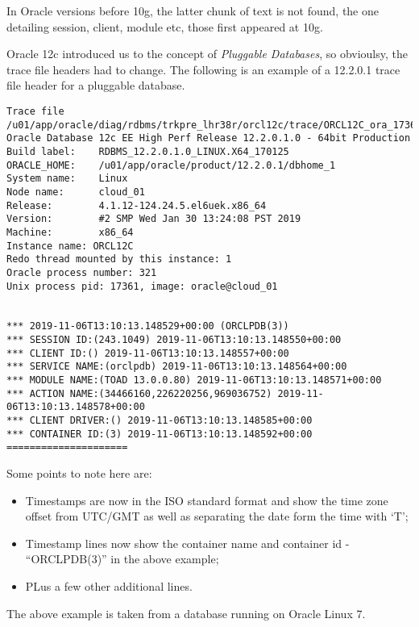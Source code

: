 In Oracle versions before 10g, the latter chunk of text is not found, the one detailing session, client, module etc, those first appeared at 10g.

Oracle 12c introduced us to the concept of \emph{Pluggable Databases}, so obvioulsy, the trace file headers had to change. The following is an example of a 12.2.0.1 trace file header for a pluggable database.

\begin{lstlisting}[numbers=none,caption={Oracle 12c Trace File Header}]
Trace file /u01/app/oracle/diag/rdbms/trkpre_lhr38r/orcl12c/trace/ORCL12C_ora_17361_NORM2.trc
Oracle Database 12c EE High Perf Release 12.2.0.1.0 - 64bit Production
Build label:    RDBMS_12.2.0.1.0_LINUX.X64_170125
ORACLE_HOME:    /u01/app/oracle/product/12.2.0.1/dbhome_1
System name:    Linux
Node name:      cloud_01
Release:        4.1.12-124.24.5.el6uek.x86_64
Version:        #2 SMP Wed Jan 30 13:24:08 PST 2019
Machine:        x86_64
Instance name: ORCL12C
Redo thread mounted by this instance: 1
Oracle process number: 321
Unix process pid: 17361, image: oracle@cloud_01


*** 2019-11-06T13:10:13.148529+00:00 (ORCLPDB(3))
*** SESSION ID:(243.1049) 2019-11-06T13:10:13.148550+00:00
*** CLIENT ID:() 2019-11-06T13:10:13.148557+00:00
*** SERVICE NAME:(orclpdb) 2019-11-06T13:10:13.148564+00:00
*** MODULE NAME:(TOAD 13.0.0.80) 2019-11-06T13:10:13.148571+00:00
*** ACTION NAME:(34466160,226220256,969036752) 2019-11-06T13:10:13.148578+00:00
*** CLIENT DRIVER:() 2019-11-06T13:10:13.148585+00:00
*** CONTAINER ID:(3) 2019-11-06T13:10:13.148592+00:00
=====================
\end{lstlisting}

Some points to note here are:

\begin{itemize}
	\item Timestamps are now in the ISO standard format and show the time zone offset from UTC/GMT as well as separating the date form the time with `T';
	\item Timestamp lines now show the container name and container id - ``ORCLPDB(3)'' in the above example;
	\item PLus a few other additional lines.
\end{itemize}

The above example is taken from a database running on Oracle Linux 7.

